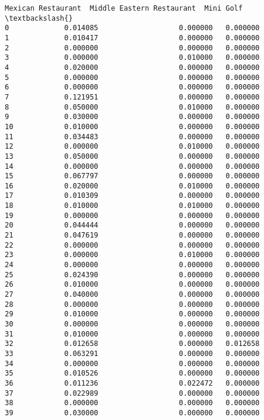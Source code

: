 \documentclass[11pt]{article}
\begin{document}
\begin{tcolorbox}[breakable, size=fbox, boxrule=.5pt, pad at break*=1mm, opacityfill=0]
\begin{Verbatim}[commandchars=\\\{\}]
    Mexican Restaurant  Middle Eastern Restaurant  Mini Golf  \textbackslash{}
0             0.014085                   0.000000   0.000000
1             0.010417                   0.000000   0.000000
2             0.000000                   0.000000   0.000000
3             0.000000                   0.010000   0.000000
4             0.020000                   0.000000   0.000000
5             0.000000                   0.000000   0.000000
6             0.000000                   0.000000   0.000000
7             0.121951                   0.000000   0.000000
8             0.050000                   0.010000   0.000000
9             0.030000                   0.000000   0.000000
10            0.010000                   0.000000   0.000000
11            0.034483                   0.000000   0.000000
12            0.000000                   0.010000   0.000000
13            0.050000                   0.000000   0.000000
14            0.000000                   0.000000   0.000000
15            0.067797                   0.000000   0.000000
16            0.020000                   0.010000   0.000000
17            0.010309                   0.000000   0.000000
18            0.010000                   0.010000   0.000000
19            0.000000                   0.000000   0.000000
20            0.044444                   0.000000   0.000000
21            0.047619                   0.000000   0.000000
22            0.000000                   0.000000   0.000000
23            0.000000                   0.010000   0.000000
24            0.000000                   0.000000   0.000000
25            0.024390                   0.000000   0.000000
26            0.010000                   0.000000   0.000000
27            0.040000                   0.000000   0.000000
28            0.000000                   0.000000   0.000000
29            0.010000                   0.000000   0.000000
30            0.000000                   0.000000   0.000000
31            0.010000                   0.000000   0.000000
32            0.012658                   0.000000   0.012658
33            0.063291                   0.000000   0.000000
34            0.000000                   0.000000   0.000000
35            0.010526                   0.000000   0.000000
36            0.011236                   0.022472   0.000000
37            0.022989                   0.000000   0.000000
38            0.000000                   0.000000   0.000000
39            0.030000                   0.000000   0.000000


\end{Verbatim}
\end{tcolorbox}
\end{document}
